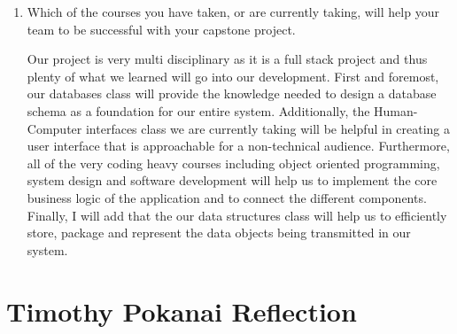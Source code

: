 \begin{enumerate}
  \item Which of the courses you have taken, or are currently taking, will help
  your team to be successful with your capstone project.

  \par{ Our project is very multi disciplinary as it is a full stack project and thus plenty of what we learned will go into
  our development. First and foremost, our databases class will provide the knowledge needed to design a database schema as a foundation
  for our entire system. Additionally, the Human-Computer interfaces class we are currently taking will be helpful in creating a user interface
  that is approachable for a non-technical audience. Furthermore, all of the very coding heavy courses including object oriented programming, system
  design and software development will help us to implement the core business logic of the application and to connect the different components.
  Finally, I will add that the our data structures class will help us to efficiently store, package and represent the data objects being transmitted
  in our system. }
\end{enumerate}

\section{Timothy Pokanai Reflection}

